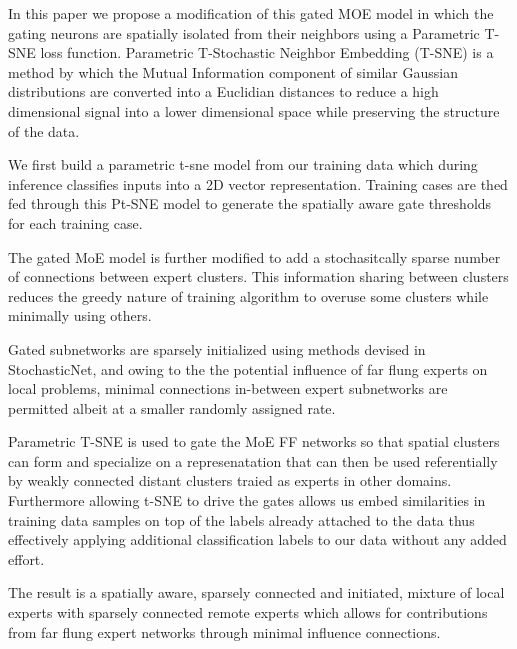 \documentclass{llncs}
\begin{document}
In this paper we propose a modification of this gated MOE model in which the gating neurons are spatially isolated from their neighbors
using a Parametric T-SNE loss function. Parametric T-Stochastic Neighbor Embedding (T-SNE) is a method by which the Mutual Information component of similar Gaussian distributions are converted into a Euclidian distances to reduce a high dimensional signal into a lower dimensional space while preserving the structure of the data.

We first build a parametric t-sne model from our training data which during inference classifies inputs into a 2D vector representation. Training cases are thed fed through this Pt-SNE model to generate the spatially aware gate thresholds for each training case.

The gated MoE model is further modified to add a stochasitcally sparse number of connections between expert clusters.  This information sharing between clusters reduces the greedy nature of training algorithm to overuse some clusters while minimally using others.

Gated subnetworks are sparsely initialized using methods devised in StochasticNet, and owing to the the potential influence of far flung experts on local problems, minimal connections in-between expert subnetworks are permitted albeit at a smaller randomly assigned rate.

Parametric T-SNE is used to gate the MoE FF networks so that spatial clusters can form and specialize on a represenatation that can then be used referentially by weakly connected distant clusters traied as experts in other domains. Furthermore allowing t-SNE to drive the gates allows us embed similarities in training data samples on top of the labels already attached to the data thus effectively applying additional classification labels to our data without any added effort.

The result is a spatially aware, sparsely connected and initiated, mixture of local experts with sparsely connected remote experts which allows for contributions from far flung expert networks through minimal influence connections.

%
%
 
 

\end{document}
